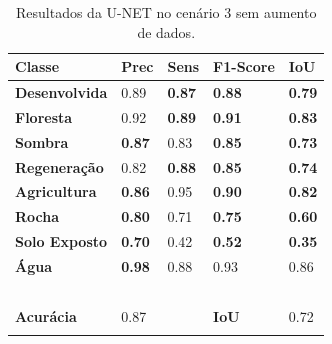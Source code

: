\documentclass[%
  10pt,%
  aspectratio = 169,%
  compress,%
  t,%
  english,%
  brazilian,%
  tikz,
]{beamer}
\begin{document}
\begin{frame}
\begin{columns}[T]
\begin{table}[!ht]
    \centering
    \caption{Resultados da U-NET no cenário 3 sem aumento de dados.}%
    \label{tab:res:cen32}%
    \begin{tabular}{lllll}
    \toprule
        \textbf{Classe} & \textbf{Prec} & \textbf{Sens} & \textbf{F1-Score} & \textbf{IoU} \\
        \midrule
        \textbf{Desenvolvida}               & 0.89 & \textbf{0.87} & \textbf{0.88} & \textbf{0.79} \\ 
        \textbf{Floresta}                   & 0.92 & \textbf{0.89} & \textbf{0.91} & \textbf{0.83} \\ 
        \textbf{Sombra}                     & \textbf{0.87} & 0.83 & \textbf{0.85} & \textbf{0.73} \\ 
        \textbf{Regeneração}                & 0.82 & \textbf{0.88} & \textbf{0.85} & \textbf{0.74} \\ 
        \textbf{Agricultura}                & \textbf{0.86} & 0.95 & \textbf{0.90} & \textbf{0.82} \\ 
        \textbf{Rocha}                      & \textbf{0.80} & 0.71 & \textbf{0.75} & \textbf{0.60} \\ 
        \textbf{Solo Exposto}               & \textbf{0.70} & 0.42 & \textbf{0.52} & \textbf{0.35} \\ 
        \textbf{Água}                       & \textbf{0.98} & 0.88 & 0.93 & 0.86 \\ 
        \textbf{} & ~ & ~ & ~ & ~ \\ 
        \textbf{Acurácia} & 0.87 & ~ & \textbf{IoU} & 0.72 \\
        \bottomrule
        \addlinespace
    \end{tabular}
\end{table}

\end{columns}
\end{frame}
\end{document}
